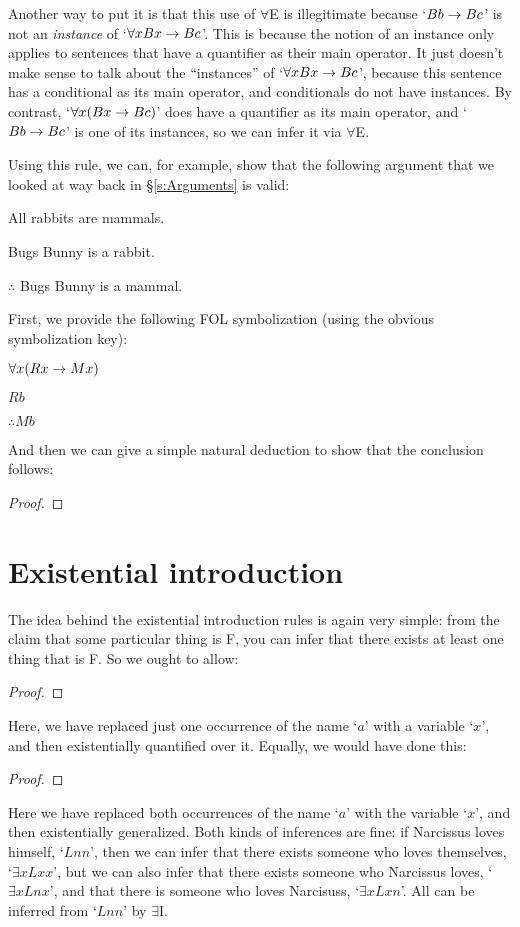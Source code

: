 Another way to put it is that this use of $\forall$E is illegitimate because `$Bb \rightarrow Bc$' is not an \emph{instance} of `$\forall x Bx \rightarrow Bc$'.  This is because the notion of an instance only applies to sentences that have a quantifier as their main operator.  It just doesn't make sense to talk about the ``instances'' of `$\forall x Bx \rightarrow Bc$', because this sentence has a conditional as its main operator, and conditionals do not have instances.  By contrast, `$\forall x(Bx \rightarrow Bc)$' does have a quantifier as its main operator, and `$Bb \rightarrow Bc$' is one of its instances, so we can infer it via $\forall$E.

Using this rule, we can, for example, show that the following argument that we looked at way back in \S\ref{s:Arguments} is valid:
\begin{earg}
\item[]All rabbits are mammals.
\item[] Bugs Bunny is a rabbit.
\item[] $\therefore$ Bugs Bunny is a mammal.
\end{earg}
First, we provide the following FOL symbolization (using the obvious symbolization key):
\begin{earg}
\item[]$\forall x(Rx \rightarrow Mx)$
\item[] $Rb$
\item[] $\therefore Mb$
\end{earg}
And then we can give a simple natural deduction to show that the conclusion follows:

\begin{proof}
	  
	 
	 
\end{proof}



\section{Existential introduction}
The idea behind the existential introduction rules is again very simple: from the claim that some particular thing is F, you can infer that there exists at least one thing that is F. So we ought to allow:
\begin{proof}
	 
\end{proof}
Here, we have replaced just one occurrence of the name `$a$' with a variable `$x$', and then existentially quantified over it. Equally, we would have done this:
\begin{proof}
	 
\end{proof}
Here we have replaced both occurrences of the name `$a$' with the variable `$x$', and then existentially generalized. Both kinds of inferences are fine: if Narcissus loves himself, `$Lnn$', then we can infer that there exists someone who loves themselves, `$\exists xLxx$', but we can also infer that there exists someone who Narcissus loves, `$\exists xLnx$', and that there is someone who loves Narcisuss, `$\exists xLxn$'.  All can be inferred from `$Lnn$' by $\exists$I.


